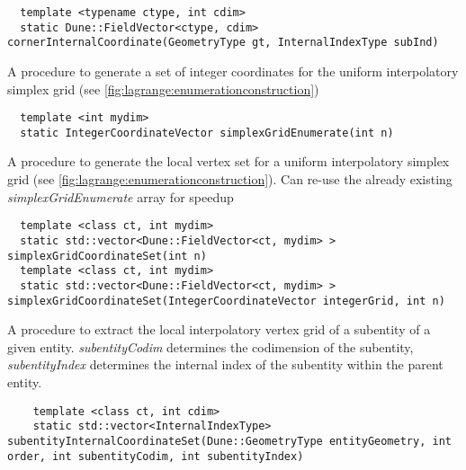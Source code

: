 \begin{mybox}
\begin{lstlisting}
  template <typename ctype, int cdim>
  static Dune::FieldVector<ctype, cdim> cornerInternalCoordinate(GeometryType gt, InternalIndexType subInd)
\end{lstlisting}
\end{mybox}

\noindent
A procedure to generate a set of integer coordinates for the uniform interpolatory simplex grid (see \cref{fig:lagrange:enumerationconstruction}) \\

\begin{mybox}
\begin{lstlisting}
  template <int mydim>
  static IntegerCoordinateVector simplexGridEnumerate(int n)
\end{lstlisting}
\end{mybox}

\noindent
A procedure to generate the local vertex set for a uniform interpolatory simplex grid (see \cref{fig:lagrange:enumerationconstruction}). Can re-use the already existing \textit{simplexGridEnumerate} array for speedup \\

\begin{mybox}
\begin{lstlisting}
  template <class ct, int mydim>
  static std::vector<Dune::FieldVector<ct, mydim> > simplexGridCoordinateSet(int n)
  template <class ct, int mydim>
  static std::vector<Dune::FieldVector<ct, mydim> > simplexGridCoordinateSet(IntegerCoordinateVector integerGrid, int n)
\end{lstlisting}
\end{mybox}


\noindent
A procedure to extract the local interpolatory vertex grid of a subentity of a given entity. \textit{subentityCodim} determines the codimension of the subentity, \textit{subentityIndex} determines the internal index of the subentity within the parent entity.

\begin{mybox}
\begin{lstlisting}
    template <class ct, int cdim>
    static std::vector<InternalIndexType> subentityInternalCoordinateSet(Dune::GeometryType entityGeometry, int order, int subentityCodim, int subentityIndex)
\end{lstlisting}
\end{mybox}


